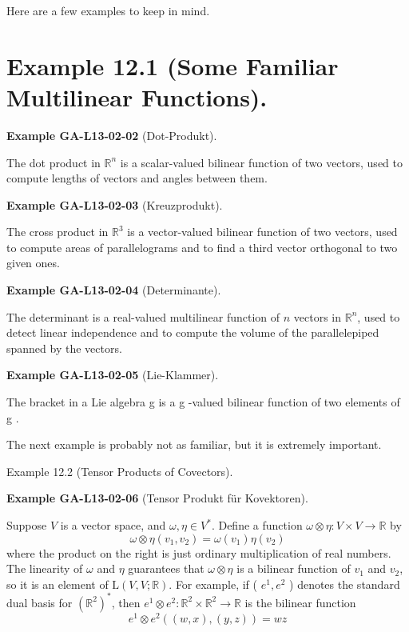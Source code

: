 \documentclass[10pt, letterpaper]{article}
\newcommand{\CustomHeading}[3]{%
  \par\medskip\noindent%
  \textbf{#1 #2} \textnormal{(#3)}.\enskip%
}
\newenvironment{EXA}[2]{\begin{unitbox}\CustomHeading{Example}{#1}{#2}}{\end{unitbox}}
\begin{document}
Here are a few examples to keep in mind.



\section*{Example 12.1 (Some Familiar Multilinear Functions).}


\begin{EXA}{GA-L13-02-02}{Dot-Produkt}
The dot product in $\mathbb{R}^{n}$ is a scalar-valued bilinear function of two vectors, used to compute lengths of vectors and angles between them.
\end{EXA}




\begin{EXA}{GA-L13-02-03}{Kreuzprodukt}
The cross product in $\mathbb{R}^{3}$ is a vector-valued bilinear function of two vectors, used to compute areas of parallelograms and to find a third vector orthogonal to two given ones.
\end{EXA}




\begin{EXA}{GA-L13-02-04}{Determinante}
The determinant is a real-valued multilinear function of $n$ vectors in $\mathbb{R}^{n}$, used to detect linear independence and to compute the volume of the parallelepiped spanned by the vectors.
\end{EXA}



\begin{EXA}{GA-L13-02-05}{Lie-Klammer}
The bracket in a Lie algebra g is a g -valued bilinear function of two elements of g .
\end{EXA}


The next example is probably not as familiar, but it is extremely important.


Example 12.2 (Tensor Products of Covectors). 

\begin{EXA}{GA-L13-02-06}{Tensor Produkt für Kovektoren}
Suppose $V$ is a vector space, and $\omega, \eta \in V^{*}$. Define a function $\omega \otimes \eta: V \times V \rightarrow \mathbb{R}$ by
$$
\omega \otimes \eta\left(v_{1}, v_{2}\right)=\omega\left(v_{1}\right) \eta\left(v_{2}\right)
$$
where the product on the right is just ordinary multiplication of real numbers. The linearity of $\omega$ and $\eta$ guarantees that $\omega \otimes \eta$ is a bilinear function of $v_{1}$ and $v_{2}$, so it is an element of $\mathrm{L}(V, V ; \mathbb{R})$. For example, if ( $e^{1}, e^{2}$ ) denotes the standard dual basis for $\left(\mathbb{R}^{2}\right)^{*}$, then $e^{1} \otimes e^{2}: \mathbb{R}^{2} \times \mathbb{R}^{2} \rightarrow \mathbb{R}$ is the bilinear function
$$
e^{1} \otimes e^{2}((w, x),(y, z))=w z
$$
\end{EXA}
\end{document}
